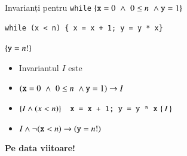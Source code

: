 \documentclass[xcolor=pdftex,romanian,colorlinks]{beamer}
\begin{document}
%
%
%
%
%

\begin{frame}[fragile]{Invarianți pentru \texttt{while}}
$\{\mbox{\texttt{x}}=0\,\,\wedge\,\, 0\leq n \,\, \wedge \mbox{\texttt{y}}=1\}$\\
\begin{verbatim}
while (x < n) { x = x + 1; y = y * x}
\end{verbatim}
$\{\mbox{\texttt{y}}=n!\}$

\vfill
\pause
\begin{itemize}
\item Invariantul $I$ este 

\pause

\item $(\mbox{\texttt{x}}=0\,\,\wedge\,\, 0\leq n \,\, \wedge \mbox{\texttt{y}}=1)\to I$
\item $\{I\wedge (x < n)\} \mbox{\texttt{ {
   x = x + 1; y = y * x}}} \,\,\{\,I\,\}$
\item $I \wedge \neg(\mbox{\texttt{x}} < n)\to (\mbox{\texttt{y}}=n!)$

\end{itemize}

\end{frame}


\begin{frame}
  \vfill
  \centering

\textbf{Pe data viitoare!}

  \vfill
\end{frame}
\end{document}
